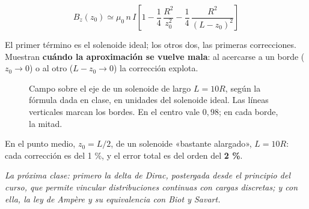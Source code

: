 \documentclass[12pt,a4paper]{article}
\begin{document}
\begin{keybox}
\[
\boxed{\ B_z(z_0) \simeq \mu_0\,n\,I\left[1 - \frac14\,\frac{R^2}{z_0^2}
- \frac14\,\frac{R^2}{(L-z_0)^2}\right]\ }
\]
\end{keybox}

El primer término es el solenoide ideal; los otros dos, las primeras
correcciones. Muestran \textbf{cuándo la aproximación se vuelve mala}: al acercarse
a un borde ($z_0\to0$) o al otro ($L-z_0\to0$) la corrección explota.

\begin{figure}[H]
  \centering
  
  \caption{Campo sobre el eje de un solenoide de largo $L = 10R$, según la fórmula dada en clase, en unidades del solenoide ideal. Las líneas verticales marcan los bordes. En el centro vale $0{,}98$; en cada borde, la mitad.}
\end{figure}

\begin{notebox}
En el punto medio, $z_0 = L/2$, de un solenoide «bastante
alargado», $L = 10R$: cada corrección es del 1 \%, y el error total es del
orden del \textbf{2 \%}.
\end{notebox}

\noindent\emph{La próxima clase: primero la delta de Dirac, postergada desde el principio del
curso, que permite vincular distribuciones continuas con cargas discretas; y
con ella, la ley de Ampère y su equivalencia con Biot y Savart.}
\end{document}
